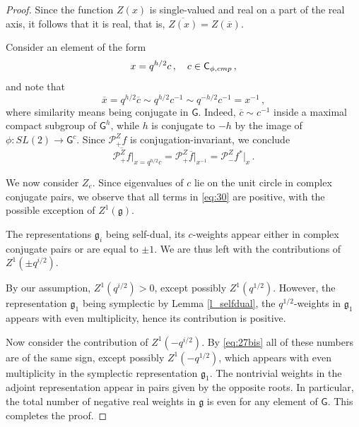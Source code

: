 \documentclass[10pt,a4paper]{amsart}
\newcommand{\bC}{\mathsf{C}}
\newcommand{\bG}{\mathsf{G}}
\newcommand{\cP}{\mathscr{P}}
\newcommand{\comp}{\textup{cmp}}
\newcommand{\fg}{\mathfrak{g}}
\begin{document}
\begin{proof}
Since the function $Z(x)$ is single-valued and real on a part of the
real axis, it follows that it is real, that is, $\overline{Z(x)} =
Z(\overline{x})$.

Consider an element of the form
\[
  x = q^{h/2} c \,, \quad c \in \bC_{\phi,\comp} \,, 
\]
and note that
\[
  \overline{x} =  q^{h/2} \overline{c} \sim q^{h/2} c^{-1} \sim 
q^{-h/2} c^{-1} = x^{-1} \,, 
\]
where similarity means being conjugate in $\bG$. Indeed,
$\overline{c}\sim c^{-1}$ inside a maximal compact subgroup of
$\bG^h$, while $h$ is conjugate to
$-h$ by the image of $\phi: SL(2)\to \bG^c$. 
Since $\cP_{+}^Z f$ is conjugation-invariant, we conclude 
\[
  \overline{\cP_{+}^Z f} \Big|_{x=q^{h/2}c }= \cP_{+}^Z \overline{f} \Big|_{x^{-1}} =
\cP_{-}^Z f^* \Big|_{x} \,.
\]

We now consider $Z_e$. Since eigenvalues of $c$ lie on the unit circle
in complex conjugate pairs, we observe that all terms in \eqref{eq:30}
are positive, with the possible exception of $Z^1(\fg)$.

The
representations $\fg_i$ being self-dual, its $c$-weights appear either
in complex conjugate pairs or are equal to $\pm 1$. We are thus left
with the contributions of $Z^1(\pm q^{i/2})$.

By our assumption, $Z^1(q^{i/2})>0$, except possibly $Z^1(q^{1/2})$.
However, the
representation $\fg_1$ being symplectic by Lemma \ref{l_selfdual}, the
$q^{1/2}$-weights in $\fg_1$ appears with even multiplicity, hence
its contribution is positive. 

Now consider the contribution of $Z^1(- q^{i/2})$. By \eqref{eq:27bis} all of these
numbers are of the same sign, except possibly $Z^1(- q^{1/2})$, which
appears with even multiplicity in the symplectic representation
$\fg_1$. The nontrivial weights in the adjoint
representation appear in pairs given by the opposite roots. In
particular, the total number of negative real weights in $\fg$ is even for
any element of $\bG$. This completes the proof. 
\end{proof}
\end{document}
